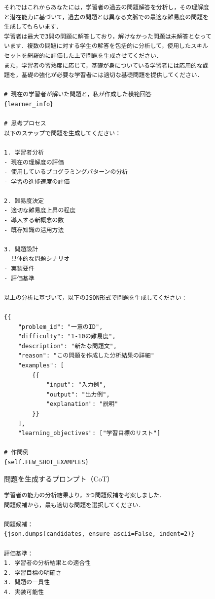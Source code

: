 \documentclass[11pt]{jreport}
\begin{document}
\begin{appendices}
\begin{figure}[!hbt]
\begin{mdframed}[linewidth=1pt]
\begin{lstlisting}
それではこれからあなたには，学習者の過去の問題解答を分析し，その理解度と潜在能力に基づいて，過去の問題とは異なる文脈での最適な難易度の問題を生成してもらいます．
学習者は最大で3問の問題に解答しており，解けなかった問題は未解答となっています．複数の問題に対する学生の解答を包括的に分析して，使用したスキルセットを網羅的に評価した上で問題を生成させてください．
また，学習者の習熟度に応じて，基礎が身についている学習者には応用的な課題を，基礎の強化が必要な学習者には適切な基礎問題を提供してください．

# 現在の学習者が解いた問題と，私が作成した模範回答
{learner_info}

# 思考プロセス
以下のステップで問題を生成してください：

1. 学習者分析
- 現在の理解度の評価
- 使用しているプログラミングパターンの分析
- 学習の進捗速度の評価

2. 難易度決定
- 適切な難易度上昇の程度
- 導入する新概念の数
- 既存知識の活用方法

3. 問題設計
- 具体的な問題シナリオ
- 実装要件
- 評価基準

以上の分析に基づいて，以下のJSON形式で問題を生成してください：

{{
    "problem_id": "一意のID",
    "difficulty": "1-10の難易度",
    "description": "新たな問題文",
    "reason": "この問題を作成した分析結果の詳細"
    "examples": [
        {{
            "input": "入力例",
            "output": "出力例",
            "explanation": "説明"
        }}
    ],
    "learning_objectives": ["学習目標のリスト"]

# 作問例
{self.FEW_SHOT_EXAMPLES}
\end{lstlisting}
\end{mdframed}
\caption{問題を生成するプロンプト（CoT）}
    \label{fig:base-prompt}
\end{figure}


\begin{figure}[!hbt]
\begin{mdframed}[linewidth=1pt]
\begin{lstlisting}
学習者の能力の分析結果より，3つ問題候補を考案しました．
問題候補から，最も適切な問題を選択してください．

問題候補：
{json.dumps(candidates, ensure_ascii=False, indent=2)}

評価基準：
1. 学習者の分析結果との適合性
2. 学習目標の明確さ
3. 問題の一貫性
4. 実装可能性


\end{lstlisting}
\end{mdframed}
\end{figure}
\end{appendices}
\end{document}
